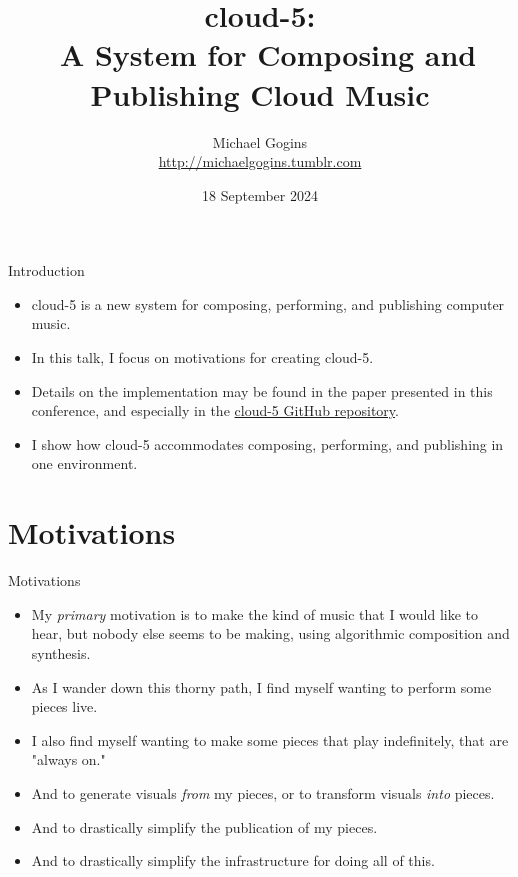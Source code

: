 \documentclass{beamer}
\title[cloud-5] %
{cloud-5: \\\
A System for Composing and Publishing Cloud Music}
\author[Gogins] %
{Michael Gogins \\ \url{http://michaelgogins.tumblr.com} }
\institute[Irreducible Productions] %
{
  Irreducible Productions\\
  New York
}
\date[18 September 2024] %
{18 September 2024}
\begin{document}

\begin{frame}
  \titlepage
\end{frame}

\begin{frame}{Introduction}
\begin{itemize}
\item cloud-5 is a new system for composing, performing, and publishing computer music. 
\item In this talk, I focus on motivations for creating cloud-5.
\item Details on the implementation may be found in the paper presented in this conference, and especially in the \href{https://github.com/gogins/cloud-5}{cloud-5 GitHub repository}.
\item I show how cloud-5 accommodates composing, performing, and publishing in one environment. 
\end{itemize}
\end{frame}


\section{Motivations}

\begin{frame}{Motivations}
\begin{itemize}
\item My \emph{primary} motivation is to make the kind of music that I would like to hear, but nobody else seems to be making, using algorithmic composition and synthesis.
\item As I wander down this thorny path, I find myself wanting to perform some pieces live.
\item I also find myself wanting to make some pieces that play indefinitely, that are "always on."
\item And to generate visuals \emph{from} my pieces, or to transform visuals \emph{into} pieces.
\item And to drastically simplify the publication of my pieces.
\item And to drastically simplify the infrastructure for doing all of this.
\end{itemize}
\end{frame}
\end{document}
